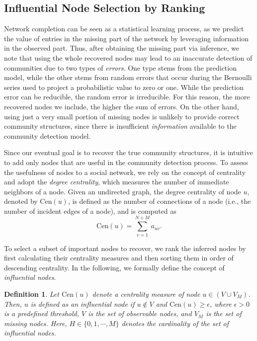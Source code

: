 \documentclass[format=acmsmall, review=false, screen=true]{acmart}
\newtheorem{definition}{Definition}%
\begin{document}
\subsection{Influential Node Selection by Ranking}\label{sec:3c}
Network completion can be seen as a statistical learning process, as we predict the value of entries in the missing part of the network by leveraging information in the observed part. Thus, after obtaining the missing part via inference, we note that using the whole recovered nodes may lead to an inaccurate detection of communities due to two types of {\em errors}. One type stems from the prediction model, while the other stems from random errors that occur during the Bernoulli series used to project a probabilistic value to zero or one. While the prediction error can be reducible, the random error is irreducible. For this reason, the more recovered nodes we include, the higher the sum of errors. On the other hand, using just a very small portion of missing nodes is unlikely to provide correct community structures, since there is insufficient {\em information} available to the community detection model.

Since our eventual goal is to recover the true community structures, it is intuitive to add only nodes that are useful in the community detection process. To assess the usefulness of nodes to a social network, we rely on the concept of centrality and adopt the {\em degree centrality}, which measures the number of immediate neighbors of a node. Given an undirected graph, the degree centrality of node $u$, denoted by $\text{Cen}(u)$, is defined as the number of connections of a node (i.e., the number of incident edges of a node), and is computed as
\begin{equation}\label{eq:degreecen}
\text{Cen}(u) = \sum_{v=1}^{N+M} a_{uv}.
\end{equation} 

To select a subset of important nodes to recover, we rank the inferred nodes by first calculating their centrality measures and then sorting them in order of descending centrality. In the following, we formally define the concept of {\em influential nodes}.

\begin{definition}\label{def:2}
Let $\text{Cen}(u)$ denote a centrality measure of node $u \in (V \cup V_M)$. Then, $u$ is defined as an influential node if $u \notin V$ and $\text{Cen}(u) \geq \epsilon$, where $\epsilon > 0$ is a predefined threshold, $V$ is the set of observable nodes, and $V_M$ is the set of missing nodes. Here, $H \in \{0,1,\cdots,M\}$ denotes the cardinality of the set of influential nodes.
\end{definition}
\end{document}
